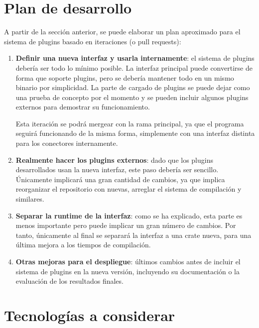\section{Plan de desarrollo}

A partir de la sección anterior, se puede elaborar un plan aproximado para el
sistema de plugins basado en iteraciones (o pull requests):

\begin{enumerate}
    \item \textbf{Definir una nueva interfaz y usarla internamente}: el sistema
        de plugins debería ser todo lo mínimo posible. La interfaz principal
        puede convertirse de forma que soporte plugins, pero se debería mantener
        todo en un mismo binario por simplicidad. La parte de cargado de plugins
        se puede dejar como una prueba de concepto por el momento y se pueden
        incluir algunos plugins externos para demostrar su funcionamiento.

        Esta iteración se podrá mergear con la rama principal, ya que el
        programa seguirá funcionando de la misma forma, simplemente con una
        interfaz distinta para los conectores internamente.

    \item \textbf{Realmente hacer los plugins externos}: dado que los plugins
        desarrollados usan la nueva interfaz, este paso debería ser sencillo.
        Únicamente implicará una gran cantidad de cambios, ya que implica
        reorganizar el repositorio con \crates nuevas, arreglar el sistema de
        compilación y similares.

    \item \textbf{Separar la runtime de la interfaz}: como se ha explicado, esta
        parte es menos importante pero puede implicar un gran número de cambios.
        Por tanto, únicamente al final se separará la interfaz a una crate
         nueva, para una última mejora a los tiempos de
        compilación.

    \item \textbf{Otras mejoras para el despliegue}: últimos cambios antes de
        incluir el sistema de plugins en la nueva versión, incluyendo
        su documentación o la evaluación de los resultados finales.

\end{enumerate}

\section{Tecnologías a considerar}

